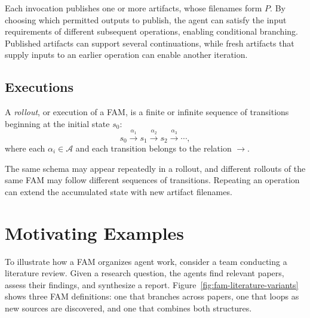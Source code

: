 \documentclass[letterpaper]{article}
\theoremstyle{definition}
\begin{document}
Each invocation publishes one or more artifacts, whose filenames form $P$.
By choosing which permitted outputs to publish, the agent can satisfy the
input requirements of different subsequent operations, enabling conditional
branching. Published artifacts can support several continuations, while
fresh artifacts that supply inputs to an earlier operation can enable
another iteration.

\subsection{Executions}

A \emph{rollout}, or execution of a FAM, is a finite or infinite sequence of
transitions beginning at the initial state $s_0$:
\[
  s_0\xrightarrow{\alpha_1}s_1
  \xrightarrow{\alpha_2}s_2
  \xrightarrow{\alpha_3}\cdots,
\]
where each $\alpha_i\in\mathcal{A}$ and each transition belongs to the
relation $\rightarrow$.

The same schema may appear repeatedly in a rollout, and different rollouts
of the same FAM may follow different sequences of transitions. Repeating
an operation can extend the accumulated state with new artifact filenames.

\section{Motivating Examples}
\label{sec:fam-literature-example}

To illustrate how a FAM organizes agent work, consider a team conducting a
literature review. Given a research question, the agents find relevant papers,
assess their findings, and synthesize a report.
Figure~\ref{fig:fam-literature-variants} shows three FAM definitions:
one that branches across papers, one that loops as new sources are discovered,
and one that combines both structures.
\end{document}
